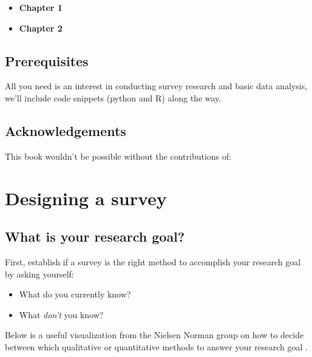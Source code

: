 \documentclass[]{book}
\providecommand{\tightlist}{%
  \setlength{\itemsep}{0pt}\setlength{\parskip}{0pt}}
\begin{document}
\begin{itemize}
\tightlist
\item
  \textbf{Chapter 1}
\item
  \textbf{Chapter 2}
\end{itemize}

\hypertarget{prerequisites}{%
\section*{Prerequisites}\label{prerequisites}}

All you need is an interest in conducting survey research and basic data analysis, we'll include code snippets (python and R) along the way.

\hypertarget{acknowledgements}{%
\section*{Acknowledgements}\label{acknowledgements}}

This book wouldn't be possible without the contributions of:

\hypertarget{macro}{%
\chapter{Designing a survey}\label{macro}}

\hypertarget{what-is-your-research-goal}{%
\section{What is your research goal?}\label{what-is-your-research-goal}}

First, establish if a survey is the right method to accomplish your research goal by asking yourself:

\begin{itemize}
\tightlist
\item
  What do you currently know?
\item
  What \emph{don't} you know?
\end{itemize}

Below is a useful visualization from the Nielsen Norman group on how to decide between which qualitative or quantitative methods to answer your research goal \citep{nng_method}.
\end{document}
